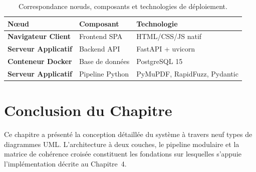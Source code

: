 \begin{table}[H]
\centering
\small
\begin{tabularx}{\textwidth}{@{}>{\bfseries}p{3cm} p{3cm} Y@{}}
\toprule
{}
N\oe{}ud & Composant & Technologie \\
\midrule
Navigateur Client & Frontend SPA & HTML/CSS/JS natif \\
Serveur Applicatif & Backend API & FastAPI + uvicorn \\
Conteneur Docker & Base de donn\'{e}es & PostgreSQL 15 \\
Serveur Applicatif & Pipeline Python & PyMuPDF, RapidFuzz, Pydantic \\
\bottomrule
\end{tabularx}
\caption{Correspondance n\oe{}uds, composants et technologies de d\'{e}ploiement.}
\label{tab:deploiement-noeuds}
\end{table}

\section*{Conclusion du Chapitre}

Ce chapitre a pr\'{e}sent\'{e} la conception d\'{e}taill\'{e}e du syst\`{e}me \`{a} travers neuf types de diagrammes UML. L'architecture \`{a} deux couches, le pipeline modulaire et la matrice de coh\'{e}rence crois\'{e}e constituent les fondations sur lesquelles s'appuie l'impl\'{e}mentation d\'{e}crite au Chapitre~4.
